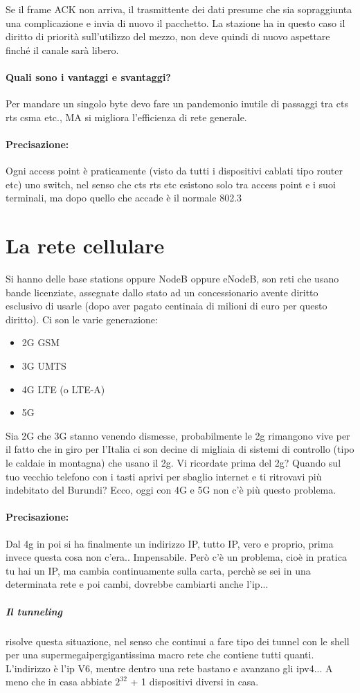 \documentclass[12pt, a4paper, openany, twoside]{book}
\begin{document}
Se il frame ACK non arriva, il trasmittente dei dati presume che sia sopraggiunta 
una complicazione e invia di nuovo il pacchetto. La stazione ha in questo caso 
il diritto di priorità sull’utilizzo del mezzo, non deve quindi di nuovo aspettare 
finché il canale sarà libero. 
\paragraph{Quali sono i vantaggi e svantaggi?} Per mandare un singolo byte devo
fare un pandemonio inutile di passaggi tra cts rts csma etc., MA si migliora 
l'efficienza di rete generale.


\paragraph{Precisazione: }Ogni access point è praticamente (visto da tutti i 
dispositivi cablati tipo router etc) uno switch, nel senso che cts rts etc esistono
solo tra access point e i suoi terminali, ma dopo quello che accade è il normale
802.3 
\section{La rete cellulare}
Si hanno delle base stations oppure NodeB oppure eNodeB, son reti che usano 
bande licenziate, assegnate dallo stato ad un concessionario avente diritto 
esclusivo di usarle (dopo aver pagato centinaia di milioni di euro per questo
diritto). Ci son le varie generazione:
\begin{itemize}
	\item 2G GSM
	\item 3G UMTS
	\item 4G LTE (o LTE-A)
	\item 5G 
\end{itemize}
Sia 2G che 3G stanno venendo dismesse, probabilmente le 2g rimangono vive per il
fatto che in giro per l'Italia ci son decine di migliaia di sistemi di controllo
(tipo le caldaie in montagna) che usano il 2g. Vi ricordate prima del 2g? Quando
sul tuo vecchio telefono con i tasti aprivi per sbaglio internet e ti ritrovavi
più indebitato del Burundi? Ecco, oggi con 4G e 5G non c'è più questo problema.
\\ 
\paragraph{Precisazione: }Dal 4g in poi si ha finalmente un indirizzo IP, tutto
IP, vero e proprio, prima invece questa cosa non c'era.. Impensabile. Però c'è
un problema, cioè in pratica tu hai un IP, ma cambia continuamente sulla carta,
perchè se sei in una determinata rete e poi cambi, dovrebbe cambiarti anche l'ip...
\subparagraph{Il tunneling} risolve questa situazione, nel senso che continui 
a fare tipo dei tunnel con le shell per una supermegaipergigantissima macro rete
che contiene tutti quanti. L'indirizzo è l'ip V6, mentre dentro una rete bastano
e avanzano gli ipv4... A meno che in casa abbiate $2^{32}$ + 1 dispositivi diversi
in casa.	
\end{document}
